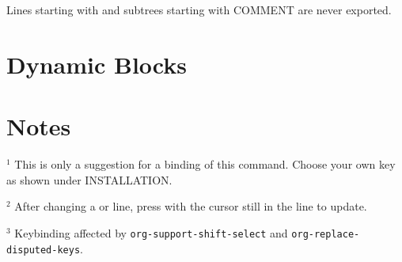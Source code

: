 Lines starting with \kbd{\#} and subtrees starting with COMMENT are
never exported.


\section{Dynamic Blocks}


\section{Notes}
$^1$ This is only a suggestion for a binding of this command.  Choose
your own key as shown under INSTALLATION.

$^2$ After changing a  or  line,
press  with the cursor still in the line to update.

$^3$ Keybinding affected by {\tt org-support-shift-select} and
 {\tt org-replace-disputed-keys}.

\copyrightnotice

\bye


